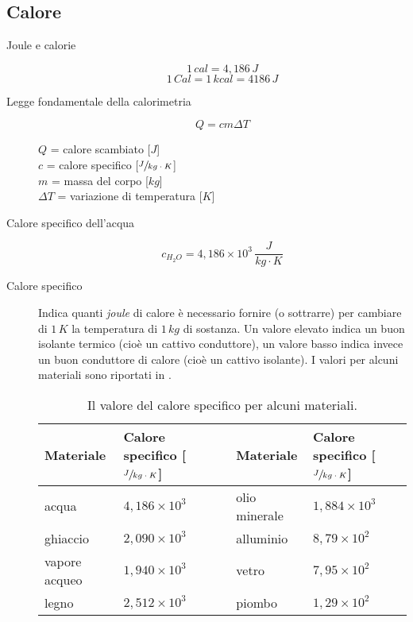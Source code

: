 \documentclass[a4paper,11pt,italian]{article}
\begin{document}
\subsection{Calore}

\begin{description}
  \item[Joule e calorie] 
  \[ 1 \, cal = 4,186 \, J \] \[ 1 \, Cal = 1 \, kcal = 4186 \, J \]
  
  \item[Legge fondamentale della calorimetria]
  \[ Q = cm \Delta T \]
  \begin{multicols}{2}
  $ Q $ = calore scambiato [$ J $]\\
  $ c $ = calore specifico [$ \sfrac{J}{kg\cdot K} $]\\
  $ m $ = massa del corpo [$ kg $]\\
  $ \Delta T $ = variazione di temperatura [$ K $]
  \end{multicols}
  
  \item[Calore specifico dell'acqua] 
  \[ c_{H_2O} = 4,186 \times 10^3 \, \frac{J}{kg \cdot K}\]

  \item[Calore specifico] Indica quanti \emph{joule} di calore è necessario fornire (o sottrarre) per cambiare di $ 1 \, K $ la temperatura di $ 1 \, kg $ di sostanza. Un valore elevato indica un buon isolante termico (cioè un cattivo conduttore), un valore basso indica invece un buon conduttore di calore (cioè un cattivo isolante). I valori per alcuni materiali sono riportati in .
  \begin{table}[htb]\centering\footnotesize
    \begin{tabular}{lllll}\toprule
    \textbf{Materiale} & \textbf{Calore specifico [$ \sfrac{J}{kg \cdot K} $]} && \textbf{Materiale} & \textbf{Calore specifico}  [$ \sfrac{J}{kg \cdot K} $]\\\midrule
    acqua          & $ 4,186 \times 10^3 $ && olio minerale  & $ 1,884 \times 10^3 $\\\addlinespace[1em]
    ghiaccio       & $ 2,090 \times 10^3 $ && alluminio      & $ 8,79  \times 10^2 $\\\addlinespace[1em]
    vapore acqueo  & $ 1,940 \times 10^3 $ && vetro          & $ 7,95  \times 10^2 $\\\addlinespace[1em]
    legno          & $ 2,512 \times 10^3 $ && piombo         & $ 1,29  \times 10^2 $\\\bottomrule
    \end{tabular}
    \caption{Il valore del calore specifico per alcuni materiali. }
    \label{tab:calorispecifici}
    \end{table}
  

\end{description}
\end{document}
